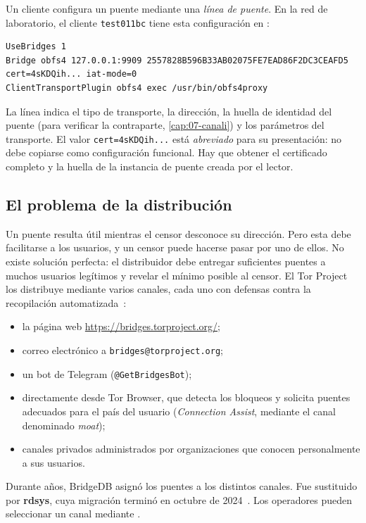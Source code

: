 Un cliente configura un puente mediante una \emph{línea de puente}. En la red de laboratorio, el cliente \texttt{test011bc} tiene esta configuración en :
\begin{lstlisting}[language=torrc,numbers=none]
UseBridges 1
Bridge obfs4 127.0.0.1:9909 2557828B596B33AB02075FE7EAD86F2DC3CEAFD5 cert=4sKDQih... iat-mode=0
ClientTransportPlugin obfs4 exec /usr/bin/obfs4proxy
\end{lstlisting}

La línea indica el tipo de transporte, la dirección, la huella de identidad del puente (para verificar la contraparte, \cref{cap:07-canali}) y los parámetros del transporte. El valor \texttt{cert=4sKDQih...} está \emph{abreviado} para su presentación: no debe copiarse como configuración funcional. Hay que obtener el certificado completo y la huella de la instancia de puente creada por el lector.

\subsection{El problema de la distribución}

Un puente resulta útil mientras el censor desconoce su dirección. Pero esta debe facilitarse a los usuarios, y un censor puede hacerse pasar por uno de ellos. No existe solución perfecta: el distribuidor debe entregar suficientes puentes a muchos usuarios legítimos y revelar el mínimo posible al censor. El Tor Project los distribuye mediante varios canales, cada uno con defensas contra la recopilación automatizada~\cite{torsupport}:
\begin{itemize}
  \item la página web \url{https://bridges.torproject.org/};
  \item correo electrónico a \texttt{bridges@torproject.org};
  \item un bot de Telegram (\texttt{@GetBridgesBot});
  \item directamente desde Tor Browser, que detecta los bloqueos y solicita puentes adecuados para el país del usuario (\emph{Connection Assist}, mediante el canal denominado \emph{moat});
  \item canales privados administrados por organizaciones que conocen personalmente a sus usuarios.
\end{itemize}

Durante años, BridgeDB asignó los puentes a los distintos canales. Fue sustituido por \textbf{rdsys}, cuya migración terminó en octubre de 2024~\cite{torblogrdsys}. Los operadores pueden seleccionar un canal mediante .

